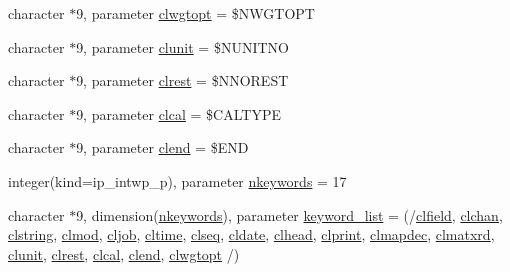 \begin{DoxyCompactItemize}
\item 
character $\ast$9, parameter \hyperlink{namespacemod__oasis__namcouple_a5ddab80f5f002c5cee81e3bbcfcda6be}{clwgtopt} = \textquotesingle{}\$N\+W\+G\+T\+O\+PT \textquotesingle{}
\item 
character $\ast$9, parameter \hyperlink{namespacemod__oasis__namcouple_a003e41234b67967593d94b3dca1a69c3}{clunit} = \textquotesingle{}\$N\+U\+N\+I\+T\+NO \textquotesingle{}
\item 
character $\ast$9, parameter \hyperlink{namespacemod__oasis__namcouple_a283471addd7aefe719c8eb6bc45072b0}{clrest} = \textquotesingle{}\$N\+N\+O\+R\+E\+ST \textquotesingle{}
\item 
character $\ast$9, parameter \hyperlink{namespacemod__oasis__namcouple_ad027273d67834ba44518cd9825f933b8}{clcal} = \textquotesingle{}\$C\+A\+L\+T\+Y\+PE \textquotesingle{}
\item 
character $\ast$9, parameter \hyperlink{namespacemod__oasis__namcouple_a52b0d4b9289219603308d3cb3fcc9eac}{clend} = \textquotesingle{}\$E\+ND \textquotesingle{}
\item 
integer(kind=ip\+\_\+intwp\+\_\+p), parameter \hyperlink{namespacemod__oasis__namcouple_ab629bd69885e9cd058f694b00474333a}{nkeywords} = 17
\item 
character $\ast$9, dimension(\hyperlink{namespacemod__oasis__namcouple_ab629bd69885e9cd058f694b00474333a}{nkeywords}), parameter \hyperlink{namespacemod__oasis__namcouple_acd9594862404b2bbd26a2ce069076b0e}{keyword\+\_\+list} = (/\hyperlink{namespacemod__oasis__namcouple_a1c3afcba25a8ba41738104d42a59e423}{clfield}, \hyperlink{namespacemod__oasis__namcouple_ac0ead9ca992504e9b580db2678926b68}{clchan}, \hyperlink{namespacemod__oasis__namcouple_a4dde076bf8cce410eebbd878f791e32e}{clstring}, \hyperlink{namespacemod__oasis__namcouple_aa5cc4d0530b3e755441ef9ef70d8083b}{clmod}, \hyperlink{namespacemod__oasis__namcouple_afbdcab2dcd637c9c70db27c8c46bd2d7}{cljob}, \hyperlink{namespacemod__oasis__namcouple_a21a2ef5048e9fc9551821e8a0b8dec0b}{cltime}, \hyperlink{namespacemod__oasis__namcouple_a0d0b7fa2be2a8202344c0ef9085c1309}{clseq}, \hyperlink{namespacemod__oasis__namcouple_a0f2d8d935f9088aec74c4dda3e9f5d9c}{cldate}, \hyperlink{namespacemod__oasis__namcouple_a15338be5483b1b392e3e5580be75704d}{clhead}, \hyperlink{namespacemod__oasis__namcouple_aeaab03598b6067fbecd8d8fc0c54443e}{clprint}, \hyperlink{namespacemod__oasis__namcouple_acb6d787969090bd3c10b20775abf6531}{clmapdec}, \hyperlink{namespacemod__oasis__namcouple_ab529642a54ad832b85c11fe4bd843314}{clmatxrd}, \hyperlink{namespacemod__oasis__namcouple_a003e41234b67967593d94b3dca1a69c3}{clunit}, \hyperlink{namespacemod__oasis__namcouple_a283471addd7aefe719c8eb6bc45072b0}{clrest}, \hyperlink{namespacemod__oasis__namcouple_ad027273d67834ba44518cd9825f933b8}{clcal}, \hyperlink{namespacemod__oasis__namcouple_a52b0d4b9289219603308d3cb3fcc9eac}{clend}, \hyperlink{namespacemod__oasis__namcouple_a5ddab80f5f002c5cee81e3bbcfcda6be}{clwgtopt} /)

\end{DoxyCompactItemize}
